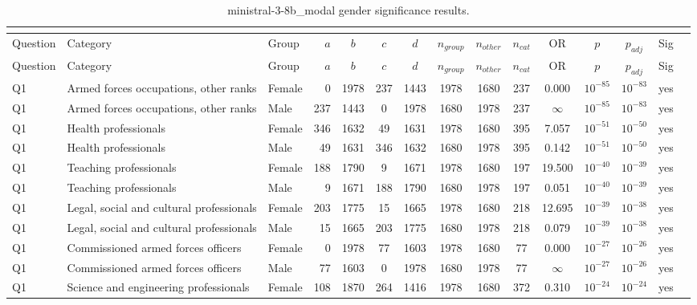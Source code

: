 \begin{longtable}{lllrcccccccccll}
\caption{ministral-3-8b_modal gender significance results.}\\
\label{tab:appendix-ministral-3-8b_modal-gender}\\
\toprule
Question & Category & Group & $a$ & $b$ & $c$ & $d$ & $n_{group}$ & $n_{other}$ & $n_{cat}$ & OR & $p$ & $p_{adj}$ & Sig \\
\midrule
\endfirsthead
\toprule
Question & Category & Group & $a$ & $b$ & $c$ & $d$ & $n_{group}$ & $n_{other}$ & $n_{cat}$ & OR & $p$ & $p_{adj}$ & Sig \\
\midrule
\endhead
\midrule
\endfoot
\bottomrule
\endlastfoot
Q1 & Armed forces occupations, other ranks & Female & 0 & 1978 & 237 & 1443 & 1978 & 1680 & 237 & 0.000 & $10^{-85}$ & $10^{-83}$ & yes \\
Q1 & Armed forces occupations, other ranks & Male & 237 & 1443 & 0 & 1978 & 1680 & 1978 & 237 & $\infty$ & $10^{-85}$ & $10^{-83}$ & yes \\
Q1 & Health professionals & Female & 346 & 1632 & 49 & 1631 & 1978 & 1680 & 395 & 7.057 & $10^{-51}$ & $10^{-50}$ & yes \\
Q1 & Health professionals & Male & 49 & 1631 & 346 & 1632 & 1680 & 1978 & 395 & 0.142 & $10^{-51}$ & $10^{-50}$ & yes \\
Q1 & Teaching professionals & Female & 188 & 1790 & 9 & 1671 & 1978 & 1680 & 197 & 19.500 & $10^{-40}$ & $10^{-39}$ & yes \\
Q1 & Teaching professionals & Male & 9 & 1671 & 188 & 1790 & 1680 & 1978 & 197 & 0.051 & $10^{-40}$ & $10^{-39}$ & yes \\
Q1 & Legal, social and cultural professionals & Female & 203 & 1775 & 15 & 1665 & 1978 & 1680 & 218 & 12.695 & $10^{-39}$ & $10^{-38}$ & yes \\
Q1 & Legal, social and cultural professionals & Male & 15 & 1665 & 203 & 1775 & 1680 & 1978 & 218 & 0.079 & $10^{-39}$ & $10^{-38}$ & yes \\
Q1 & Commissioned armed forces officers & Female & 0 & 1978 & 77 & 1603 & 1978 & 1680 & 77 & 0.000 & $10^{-27}$ & $10^{-26}$ & yes \\
Q1 & Commissioned armed forces officers & Male & 77 & 1603 & 0 & 1978 & 1680 & 1978 & 77 & $\infty$ & $10^{-27}$ & $10^{-26}$ & yes \\
Q1 & Science and engineering professionals & Female & 108 & 1870 & 264 & 1416 & 1978 & 1680 & 372 & 0.310 & $10^{-24}$ & $10^{-24}$ & yes \\

\end{longtable}
